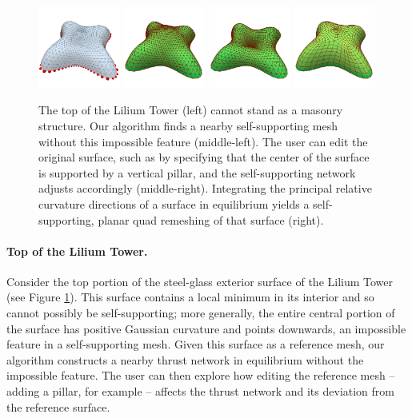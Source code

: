\documentclass[annual]{acmsiggraph}
\begin{document}
\begin{figure}[tb]
\centering
\includegraphics[width=0.24\textwidth]{fig/lilium.png} \includegraphics[width=0.24\textwidth]{fig/lilium-n.png}
\hfill
\includegraphics[width=0.24\textwidth]{fig/lilium-pillar-n.png} \includegraphics[width=0.24\textwidth]{fig/lilium-pq-n.png}
\caption{The top of the Lilium Tower (left) cannot stand as a masonry structure. Our algorithm finds a nearby self-supporting mesh without this impossible feature (middle-left). The user can edit the original surface, such as by specifying that the center of the surface is supported by a vertical pillar, and the self-supporting network adjusts accordingly (middle-right). Integrating the principal relative curvature directions of a surface in equilibrium yields a self-supporting, planar quad remeshing of that surface (right). \label{fig:Lilium}}
\end{figure}
\paragraph{Top of the Lilium Tower.}
Consider the top portion of the steel-glass exterior surface of the Lilium Tower (see Figure \ref{fig:Lilium}). This surface contains a local minimum in its interior and so cannot possibly be self-supporting; more generally, the entire central portion of the surface has positive Gaussian curvature and points downwards, an impossible feature in a self-supporting mesh. Given this surface as a reference mesh, our algorithm constructs a nearby thrust network in equilibrium without the impossible feature. The user can then explore how editing the reference mesh -- adding a pillar, for example -- affects the thrust network and its deviation from the reference surface.
\end{document}
